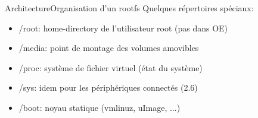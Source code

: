 \begin{frame}{Architecture}{Organisation d'un rootfs}	
	Quelques répertoires spéciaux:
	\begin{itemize}
		\item
			/root: home-directory de l'utilisateur root (pas dans OE)
		\item
			/media: point de montage des volumes amovibles
		\item
			/proc: système de fichier virtuel (état du système)
		\item
			/sys: idem pour les périphériques connectés (2.6)
		\item
			/boot: noyau statique (vmlinuz, uImage, ...)
	\end{itemize}
\end{frame}
